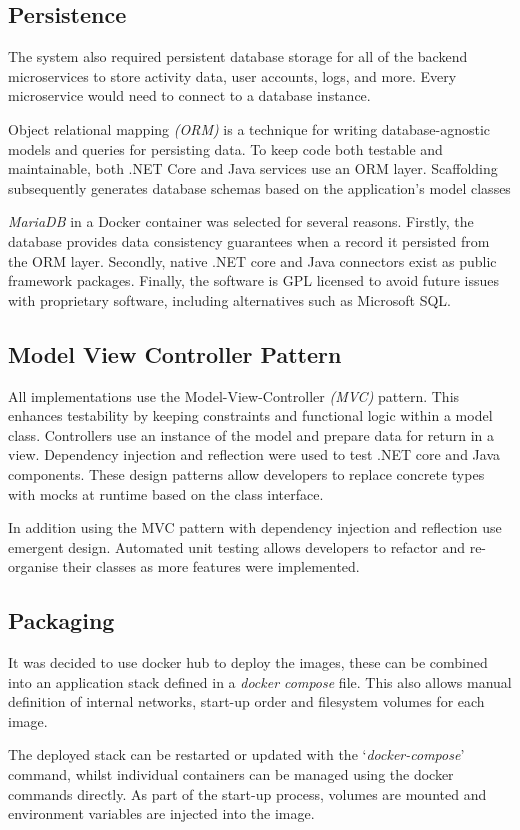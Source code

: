\subsection{Persistence}
    \par
    The system also required persistent database storage for all of the backend microservices to store activity data, user accounts, logs, and more. Every microservice would need to connect to a database instance.

    \par
    Object relational mapping \textit{(ORM)} is a technique for writing database-agnostic models and queries for persisting data. To keep code both testable and maintainable, both .NET Core and Java services use an ORM layer. Scaffolding subsequently generates database schemas based on the application's model classes

    \par
    \textit{MariaDB}\cite{MariaDB} in a Docker container was selected for several reasons. Firstly, the database provides data consistency guarantees when a record it persisted from the ORM layer. Secondly, native .NET core and Java connectors exist as public framework packages. Finally, the software is GPL licensed to avoid future issues with proprietary software, including alternatives such as Microsoft SQL.

\subsection{Model View Controller Pattern}
    \par
    All implementations use the Model-View-Controller \textit{(MVC)}
    pattern. This enhances testability by keeping constraints and functional logic within a model class. Controllers use an instance of the model and prepare data for return in a view. Dependency injection and reflection were used to test .NET core and Java components. These design patterns allow developers to replace concrete types with mocks at runtime based on the class interface.

    \par
    In addition using the MVC pattern with dependency injection and reflection use emergent design. Automated unit testing allows developers to refactor and re-organise their classes as more features were implemented.	
	
\subsection{Packaging}
    \par
    It was decided to use docker hub to deploy the images, these can be combined into an application stack defined in a \textit{docker compose} file. This also allows manual definition of internal networks, start-up order and filesystem volumes for each image.

    \par
    The deployed stack can be restarted or updated with the `\textit{docker-compose}' command, whilst individual containers can be managed using the docker commands directly. As part of the start-up process, volumes are mounted and environment variables are injected into the image.